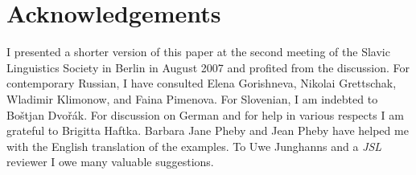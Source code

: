\documentclass[output=paper,colorlinks,citecolor=brown]{langscibook}
\begin{document}
\section*{Acknowledgements}
I presented a shorter version of this paper at the second meeting of the Slavic Linguistics Society in Berlin in August 2007 and profited from the discussion. For contemporary Russian, I have consulted Elena Gorishneva, Nikolai Grettschak, Wladimir Klimonow, and Faina Pimenova. For Slovenian, I am indebted to Boštjan Dvořák. For discussion on German and for help in various respects I am grateful to Brigitta Haftka. Barbara Jane Pheby and Jean Pheby have helped me with the English translation of the examples. To Uwe Junghanns and a \textit{JSL} reviewer I owe many valuable suggestions.

\sloppy
\printbibliography[heading=subbibliography,notkeyword=this]
\end{document}
